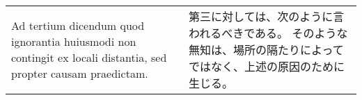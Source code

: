 \documentclass[10pt]{jsarticle} %
\begin{document}
\begin{longtable}{p{21em}p{21em}}
\\




{\sc Ad tertium dicendum} quod ignorantia
 huiusmodi non contingit ex locali distantia, sed propter causam
 praedictam.


&

第三に対しては、次のように言われるべきである。
そのような無知は、場所の隔たりによってではなく、上述の原因のために生じる。



\end{longtable}
\end{document}
